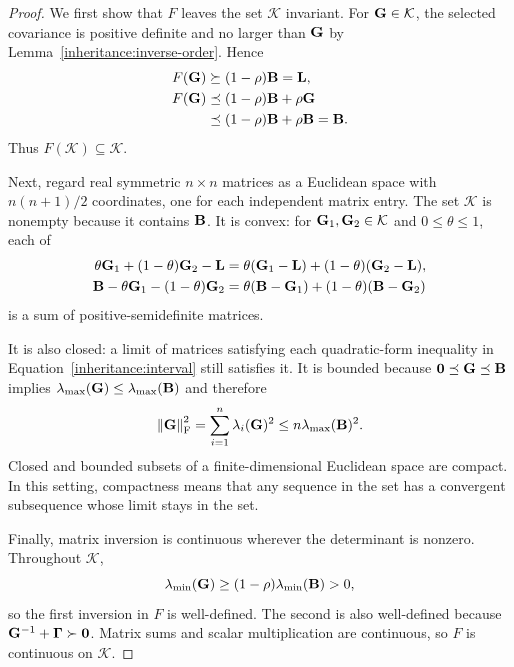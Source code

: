 \begin{proof}
  We first show that $F$ leaves the set $\mathcal K$ invariant. For
  $\mathbf{G}\in\mathcal K$, the selected covariance is positive definite
  and no larger than $\mathbf{G}$ by Lemma~\ref{inheritance:inverse-order}.
  Hence
  \begin{align}
    F(\mathbf{G})&\succeq(1-\rho)\mathbf{B}=\mathbf{L},\\
    F(\mathbf{G})&\preceq(1-\rho)\mathbf{B}+\rho\mathbf{G}\\
             &\preceq(1-\rho)\mathbf{B}+\rho\mathbf{B}=\mathbf{B}.
    \label{inheritance:invariance}
  \end{align}
  Thus $F(\mathcal K)\subseteq\mathcal K$.

  Next, regard real symmetric $n\times n$ matrices as a Euclidean space
  with $n(n+1)/2$ coordinates, one for each independent matrix entry.
  The set $\mathcal K$ is nonempty because it contains $\mathbf{B}$.
  It is convex: for $\mathbf{G}_1,\mathbf{G}_2\in\mathcal K$ and
  $0\leq\theta\leq1$, each of
  \begin{align}
    \theta\mathbf{G}_1+(1-\theta)\mathbf{G}_2-\mathbf{L}
      &=\theta(\mathbf{G}_1-\mathbf{L})+(1-\theta)(\mathbf{G}_2-\mathbf{L}),\\
    \mathbf{B}-\theta\mathbf{G}_1-(1-\theta)\mathbf{G}_2
      &=\theta(\mathbf{B}-\mathbf{G}_1)+(1-\theta)(\mathbf{B}-\mathbf{G}_2)
  \end{align}
  is a sum of positive-semidefinite matrices.

  It is also closed: a limit of matrices satisfying each quadratic-form
  inequality in Equation~\eqref{inheritance:interval} still satisfies it.
  It is bounded because $\mathbf{0}\preceq\mathbf{G}\preceq\mathbf{B}$ implies
  $\lambda_{\max}(\mathbf{G})\leq\lambda_{\max}(\mathbf{B})$ and therefore
  \begin{equation}
    \left\lVert \mathbf{G}\right\rVert_{\mathrm F}^2
       =\sum_{i=1}^{n}\lambda_i(\mathbf{G})^2
       \leq n\lambda_{\max}(\mathbf{B})^2.
  \end{equation}
  Closed and bounded subsets of a finite-dimensional Euclidean space
  are compact. In this setting, compactness means that any sequence in
  the set has a convergent subsequence whose limit stays in the set.

  Finally, matrix inversion is continuous wherever the determinant is
  nonzero. Throughout $\mathcal K$,
  \begin{equation}
    \lambda_{\min}(\mathbf{G})
       \geq(1-\rho)\lambda_{\min}(\mathbf{B})>0,
  \end{equation}
  so the first inversion in $F$ is well-defined. The second is also
  well-defined because $\mathbf{G}^{-1}+\boldsymbol{\Gamma}\succ\mathbf{0}$.
  Matrix sums and scalar multiplication are continuous, so $F$ is
  continuous on $\mathcal K$.


\end{proof}
